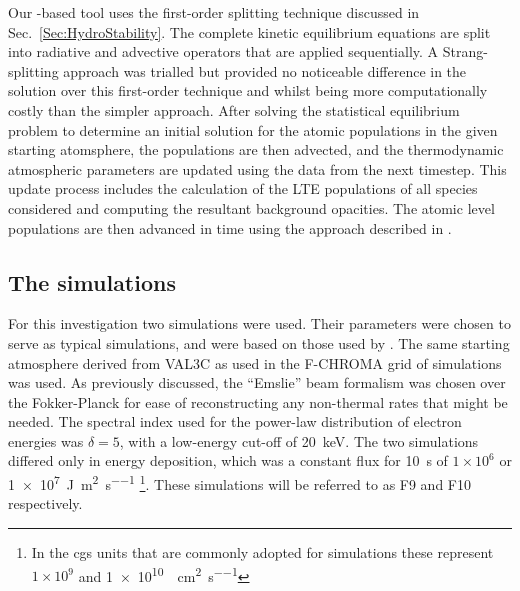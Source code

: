 Our \Lw{}-based tool uses the first-order splitting technique discussed in Sec.~\ref{Sec:HydroStability}.
The complete kinetic equilibrium equations are split into radiative and advective operators that are applied sequentially.
A Strang-splitting approach was trialled but provided no noticeable difference in the solution over this first-order technique and whilst being more computationally costly than the simpler approach.
After solving the statistical equilibrium problem to determine an initial solution for the atomic populations in the given starting atomsphere, the populations are then advected, and the thermodynamic atmospheric parameters are updated using the \Radyn{} data from the next timestep.
This update process includes the calculation of the LTE populations of all species considered and computing the resultant background opacities.
The atomic level populations are then advanced in time using the approach described in \NeedRef{}.

\subsection{The \Radyn{} simulations}

For this investigation two \Radyn{} simulations were used.
Their parameters were chosen to serve as typical simulations, and were based on those used by \citet{Kerr2019, Kerr2019a}.
The same starting atmosphere derived from VAL3C \citep{Vernazza1981} as used in the F-CHROMA grid of simulations was used.
As previously discussed, the ``Emslie'' beam formalism was chosen over the Fokker-Planck for ease of reconstructing any non-thermal rates that might be needed.
The spectral index used for the power-law distribution of electron energies was $\delta=5$, with a low-energy cut-off of \SI{20}{\kilo\electronvolt}.
The two simulations differed only in energy deposition, which was a constant flux for \SI{10}{\second} of $1\times 10^{6}$ or \SI{1e7}{\joule\per\square\metre\per\second} \footnote{In the cgs units that are commonly adopted for \Radyn{} simulations these represent $1\times 10^9$ and \SI{1e10}{\erg\per\square\centi\metre\per\second}}.
These simulations will be referred to as F9 and F10 respectively.

